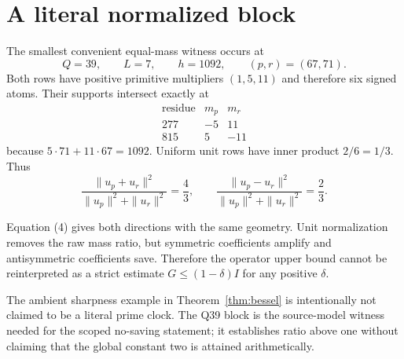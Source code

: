 \section{A literal normalized block}

The smallest convenient equal-mass witness occurs at
\[
 Q=39,\qquad L=7,\qquad h=1092,
 \qquad (p,r)=(67,71).
\]
Both rows have positive primitive multipliers $(1,5,11)$ and therefore six signed
atoms.  Their supports intersect exactly at
\[
 \begin{array}{c|cc}
 \text{residue}&m_p&m_r\\ \hline
 277&-5&11\\
 815&5&-11
 \end{array}
\]
because $5\cdot71+11\cdot67=1092$.  Uniform unit rows have inner product $2/6=1/3$.
Thus
\[
 \frac{\|u_p+u_r\|^2}{\|u_p\|^2+\|u_r\|^2}=\frac43,
 \qquad
 \frac{\|u_p-u_r\|^2}{\|u_p\|^2+\|u_r\|^2}=\frac23. \tag{4}
\]

Equation (4) gives both directions with the same geometry.  Unit normalization removes
the raw mass ratio, but symmetric coefficients amplify and antisymmetric coefficients
save.  Therefore the operator upper bound cannot be reinterpreted as a strict estimate
$G\le(1-\delta)I$ for any positive $\delta$.

The ambient sharpness example in Theorem~\ref{thm:bessel} is intentionally not claimed
to be a literal prime clock.  The Q39 block is the source-model witness needed for the
scoped no-saving statement; it establishes ratio above one without claiming that the
global constant two is attained arithmetically.
